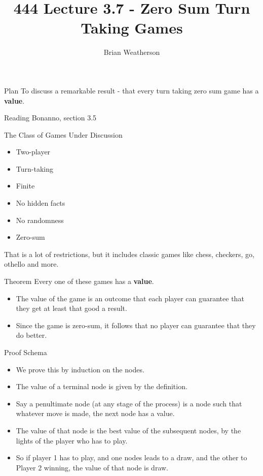 \documentclass[
  ignorenonframetext,
]{beamer}
\title{444 Lecture 3.7 - Zero Sum Turn Taking Games}
\author{Brian Weatherson}
\date{}
\providecommand{\tightlist}{%
  \setlength{\itemsep}{0pt}\setlength{\parskip}{0pt}}
\begin{document}
\frame{\titlepage}

\begin{frame}{Plan}
\protect\hypertarget{plan}{}
To discuss a remarkable result - that every turn taking zero sum game
has a \textbf{value}.
\end{frame}

\begin{frame}{Reading}
\protect\hypertarget{reading}{}
Bonanno, section 3.5
\end{frame}

\begin{frame}{The Class of Games Under Discussion}
\protect\hypertarget{the-class-of-games-under-discussion}{}
\begin{itemize}
\tightlist
\item
  Two-player
\item
  Turn-taking
\item
  Finite
\item
  No hidden facts
\item
  No randomness
\item
  Zero-sum
\end{itemize}

That is a lot of restrictions, but it includes classic games like chess,
checkers, go, othello and more.
\end{frame}

\begin{frame}{Theorem}
\protect\hypertarget{theorem}{}
Every one of these games has a \textbf{value}.

\begin{itemize}
\tightlist
\item
  The value of the game is an outcome that each player can guarantee
  that they get at least that good a result.
\item
  Since the game is zero-sum, it follows that no player can guarantee
  that they do better.
\end{itemize}
\end{frame}

\begin{frame}{Proof Schema}
\protect\hypertarget{proof-schema}{}
\begin{itemize}
\tightlist
\item
  We prove this by induction on the nodes.
\item
  The value of a terminal node is given by the definition.
\item
  Say a penultimate node (at any stage of the process) is a node such
  that whatever move is made, the next node has a value.
\item
  The value of that node is the best value of the subsequent nodes, by
  the lights of the player who has to play.
\item
  So if player 1 has to play, and one nodes leads to a draw, and the
  other to Player 2 winning, the value of that node is draw.
\end{itemize}
\end{frame}
\end{document}
